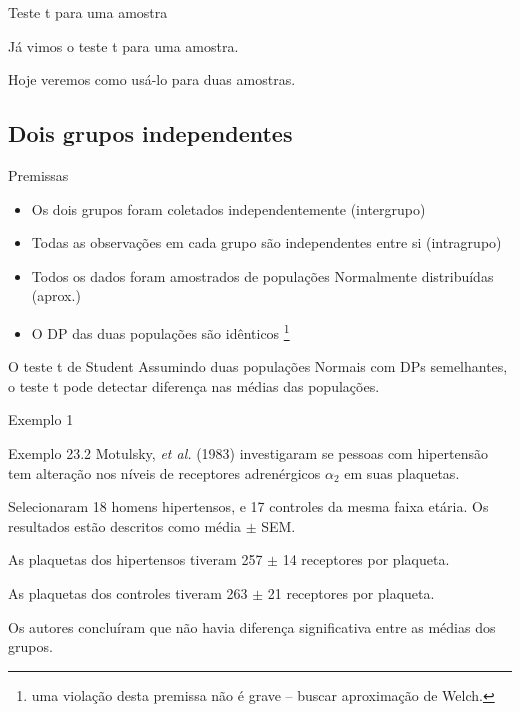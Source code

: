 \documentclass{beamer}
\begin{document}
\begin{frame}{\scriptsize Teste t para uma amostra}
  \begin{center}
    \large
    Já vimos o teste t para uma amostra.

    \bigskip
    \bigskip

    Hoje veremos como usá-lo para duas amostras.
  \end{center}
\end{frame}

\subsection{Dois grupos independentes}

\begin{frame}{\scriptsize Premissas}
  \begin{itemize}
    \scriptsize
  \item Os dois grupos foram coletados independentemente (intergrupo)
    \bigskip
  \item Todas as observações em cada grupo são independentes entre si (intragrupo)
    \bigskip
  \item Todos os dados foram amostrados de populações Normalmente distribuídas (aprox.)
    \bigskip
  \item O DP das duas populações são idênticos \footnote{\tiny uma violação desta premissa não é grave -- buscar aproximação de Welch.}
  \end{itemize}
\end{frame}

\begin{frame}{\scriptsize }
  \begin{block}{O teste t de Student}
      Assumindo duas populações Normais com DPs semelhantes, o teste t pode detectar diferença nas médias das populações.
  \end{block}
\end{frame}

\begin{frame}{\scriptsize Exemplo 1}
  \begin{exampleblock}{Exemplo 23.2}
    \scriptsize
    Motulsky, {\em et al.} (1983) investigaram se pessoas com hipertensão tem alteração nos níveis de receptores adrenérgicos $\alpha_2$ em suas plaquetas.

    \bigskip
    Selecionaram 18 homens hipertensos, e 17 controles da mesma faixa etária.
    Os resultados estão descritos como média $\pm$ SEM.

    \begin{exampleblock}{}
      \footnotesize
      As plaquetas dos hipertensos tiveram 257 $\pm$ 14 receptores por plaqueta.

      \smallskip
      As plaquetas dos controles tiveram 263 $\pm$ 21 receptores por plaqueta.
    \end{exampleblock}
    \bigskip
    Os autores concluíram que não havia diferença significativa entre as médias dos grupos.
  \end{exampleblock}
\end{frame}
\end{document}
